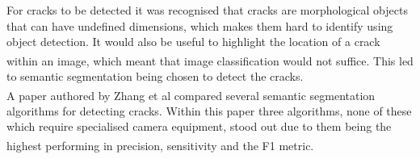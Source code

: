 \documentclass[11pt]{article}		%
\newcommand{\supercite}[1]{\textsuperscript{\cite{#1}}}		%
\begin{document}
		For cracks to be detected it was recognised that cracks are morphological objects that can have undefined dimensions, which makes them hard to identify using object detection. It would also be useful to highlight the location of a crack within an image, which meant that image classification would not suffice\supercite{morphological}. This led to semantic segmentation being chosen to detect the cracks. 
		\\
        \hspace*{2ex}A paper authored by Zhang et al\supercite{CrackGAN1} compared several semantic segmentation algorithms for detecting cracks. Within this paper three algorithms, none of these which require specialised camera equipment, stood out due to them being the highest performing in precision, sensitivity and the F1 metric\supercite{CrackGAN1}.
                    	        	       
\end{document}
